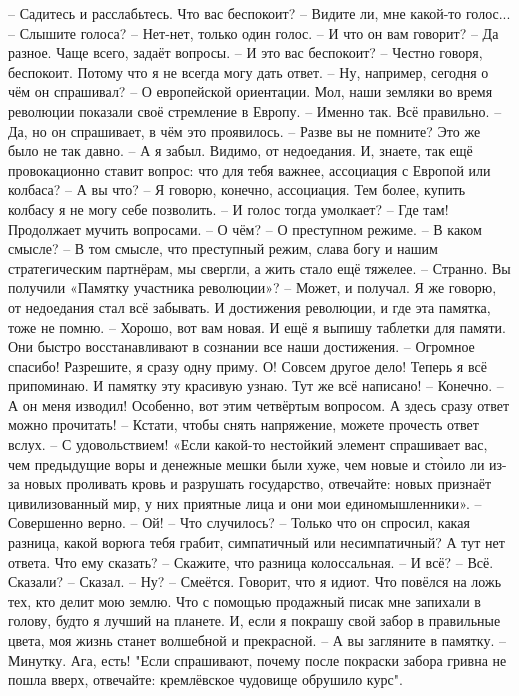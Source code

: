 \obeycr
– Садитесь и расслабьтесь. Что вас беспокоит?
– Видите ли, мне какой-то голос...
– Слышите голоса?
– Нет-нет, только один голос.
– И что он вам говорит?
– Да разное. Чаще всего, задаёт вопросы.
– И это вас беспокоит?
– Честно говоря, беспокоит. Потому что я не всегда могу дать ответ.
– Ну, например, сегодня о чём он спрашивал?
– О европейской ориентации. Мол, наши земляки во время революции показали своё стремление в Европу.
– Именно так. Всё правильно.
– Да, но он спрашивает, в чём это проявилось.
– Разве вы не помните? Это же было не так давно.
– А я забыл. Видимо, от недоедания. И, знаете, так ещё провокационно ставит вопрос: что для тебя важнее, ассоциация с Европой или колбаса?
– А вы что?
– Я говорю, конечно, ассоциация. Тем более, купить колбасу я не могу себе позволить.
– И голос тогда умолкает?
– Где там! Продолжает мучить вопросами.
– О чём?
– О преступном режиме.
– В каком смысле?
– В том смысле, что преступный режим, слава богу и нашим стратегическим партнёрам, мы свергли, а жить стало ещё тяжелее.
– Странно. Вы получили «Памятку участника революции»?
– Может, и получал. Я же говорю, от недоедания стал всё забывать. И достижения революции, и где эта памятка, тоже не помню.
– Хорошо, вот вам новая. И ещё я выпишу таблетки для памяти. Они быстро восстанавливают в сознании все наши достижения.
– Огромное спасибо! Разрешите, я сразу одну приму. О! Совсем другое дело! Теперь я всё припоминаю. И памятку эту красивую узнаю. Тут же всё написано!
– Конечно.
– А он меня изводил! Особенно, вот этим четвёртым вопросом. А здесь сразу ответ можно прочитать!
– Кстати, чтобы снять напряжение, можете прочесть ответ вслух.
– С удовольствием! «Если какой-то нестойкий элемент спрашивает вас, чем предыдущие воры и денежные мешки были хуже, чем новые и сто̀ило ли из-за новых проливать кровь и разрушать государство, отвечайте: новых признаёт цивилизованный мир, у них приятные лица и они мои единомышленники».
– Совершенно верно.
– Ой!
– Что случилось?
– Только что он спросил, какая разница, какой ворюга тебя грабит, симпатичный или несимпатичный? А тут нет ответа. Что ему сказать?
– Скажите, что разница колоссальная.
– И всё?
– Всё. Сказали?
– Сказал.
– Ну? 
– Смеётся. Говорит, что я идиот. Что повёлся на ложь тех, кто делит мою землю. Что с помощью продажный писак мне запихали в голову, будто я лучший на планете. И, если я покрашу свой забор в правильные цвета, моя жизнь станет волшебной и прекрасной.
– А вы загляните в памятку.
– Минутку. Ага, есть! "Если спрашивают, почему после покраски забора гривна не пошла вверх, отвечайте: кремлёвское чудовище обрушило курс".

